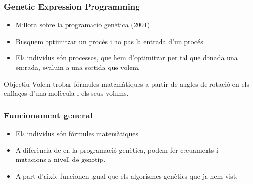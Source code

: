 \documentclass{beamer}
\begin{document}
\begin{frame}
	\frametitle{Genetic Expression Programming}
	\begin{center}
	\end{center}
	\begin{itemize}
		\item Millora sobre la programació genètica (2001)
		\item Busquem optimitzar un procés i no pas la entrada d'un procés
		\item Els individus són processos, que hem d'optimitzar per tal que donada una entrada,
			evaluin a una sortida que volem.
	\end{itemize}
	\pause
	\begin{block}{Objectiu}
		Volem trobar fórmules matemàtiques a partir de angles de rotació en els
		enllaços d'una molècula i els seus volums.
	\end{block}
\end{frame}

\begin{frame}
	\frametitle{Funcionament general}
	\begin{itemize}
		\item Els individus són fórmules matemàtiques
		\item A diferència de en la programació genètica, podem fer creuaments i
		mutacions a nivell de genotip.
		\item A part d'això, funcionen igual que els algorismes genètics que ja
		hem vist.
	\end{itemize}
\end{frame}
\end{document}
